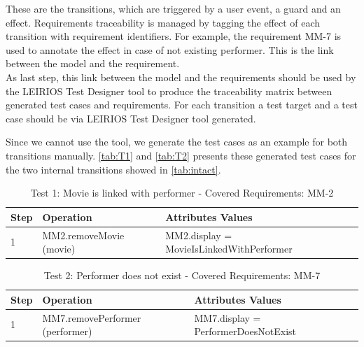 These are the transitions, which are triggered by a user event, a guard and an effect. Requirements traceability is managed by tagging the effect of each transition with requirement identifiers. For example, the requirement MM-7 is used to annotate the effect in case of not existing performer. This is the link between the model and the requirement. \\
As last step, this link between the model and the requirements should be used by the LEIRIOS Test Designer tool to produce the traceability matrix between generated test cases and requirements. For each transition a test target and a test case should be via LEIRIOS Test Designer tool generated. 

Since we cannot use the tool, we generate the test cases as an example for both transitions manually. \autoref{tab:T1} and \autoref{tab:T2} presents these generated test cases for the two internal transitions showed in \autoref{tab:intact}.

\begin{table} [H] 
  \begin{center}
  \begin{small}
\caption{Test 1: Movie is linked with performer - Covered Requirements: MM-2}
\label{tab:T1}
\begin{tabular}{ m{0.8cm} | m{5cm} | m{7.3cm} }
\hline
\textbf{Step}& \textbf{Operation}&\textbf{Attributes Values}   \\
\hline
1 & MM2.removeMovie (movie)& MM2.display = MovieIsLinkedWithPerformer\\
\hline
\end{tabular}
\end{small}
 \end{center}
\end{table}
\begin{table} [H] 
\begin{center}
 \begin{small}
\caption{Test 2: Performer does not exist - Covered Requirements: MM-7}
\label{tab:T2}
\begin{tabular}{  m{0.8cm} | m{5cm} | m{7.3cm}  }
\hline
\textbf{Step}& \textbf{Operation}&\textbf{Attributes Values}   \\
\hline
1 & MM7.removePerformer (performer) & MM7.display = PerformerDoesNotExist\\
\hline
\end{tabular}
\end{small}
 \end{center}
\end{table}



